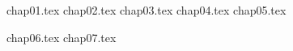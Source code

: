 \documentclass[
]{ctexbook}
\begin{document}



\setcounter{secnumdepth}{4}
\setcounter{tocdepth}{4}
\tableofcontents
% 


% 
% 

% 
% 
% 

{chap01.tex}
{chap02.tex}
{chap03.tex}
{chap04.tex}
{chap05.tex}


{chap06.tex}
{chap07.tex}
\end{document}

